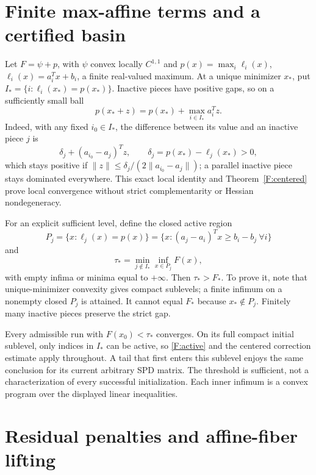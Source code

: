 \section{Finite max-affine terms and a certified basin}
Let $F=\psi+p$, with $\psi$ convex locally $C^{1,1}$ and $p(x)=\max_i\ell_i(x)$, $\ell_i(x)=a_i^Tx+b_i$, a finite real-valued maximum. At a unique minimizer $x_*$, put $I_*=\{i:\ell_i(x_*)=p(x_*)\}$. Inactive pieces have positive gaps, so on a sufficiently small ball
\begin{equation}\label{F:active}
 p(x_*+z)=p(x_*)+\max_{i\in I_*}a_i^Tz.
\end{equation}
Indeed, with any fixed $i_0\in I_*$, the difference between its value and an inactive piece $j$ is
\[
 \delta_j+(a_{i_0}-a_j)^Tz,\qquad \delta_j=p(x_*)-\ell_j(x_*)>0,
\]
which stays positive if $\|z\|\le\delta_j/(2\|a_{i_0}-a_j\|)$; a parallel inactive piece stays dominated everywhere. This exact local identity and Theorem~\ref{F:centered} prove local convergence without strict complementarity or Hessian nondegeneracy.

For an explicit sufficient level, define the closed active region
\[
 P_j=\{x:\ell_j(x)=p(x)\}
 =\{x:(a_j-a_i)^Tx\ge b_i-b_j\ \forall i\}
\]
and
\begin{equation}\label{F:basin}
 \tau_* =\min_{j\notin I_*}\inf_{x\in P_j}F(x),
\end{equation}
with empty infima or minima equal to $+\infty$. Then $\tau_*>F_*$. To prove it, note that unique-minimizer convexity gives compact sublevels; a finite infimum on a nonempty closed $P_j$ is attained. It cannot equal $F_*$ because $x_*\notin P_j$. Finitely many inactive pieces preserve the strict gap.

Every admissible run with $F(x_0)<\tau_*$ converges. On its full compact initial sublevel, only indices in $I_*$ can be active, so \eqref{F:active} and the centered correction estimate apply throughout. A tail that first enters this sublevel enjoys the same conclusion for its current arbitrary SPD matrix. The threshold is sufficient, not a characterization of every successful initialization. Each inner infimum is a convex program over the displayed linear inequalities.



\section{Residual penalties and affine-fiber lifting}

